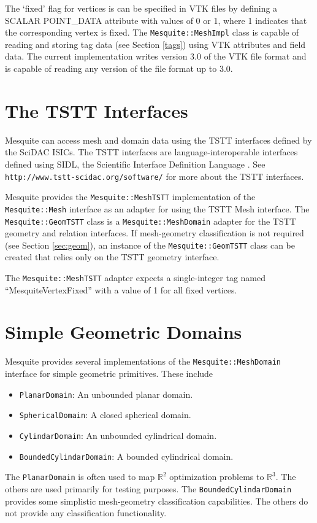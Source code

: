 The `fixed' flag for vertices is can be specified in VTK files by defining a
SCALAR POINT\_DATA attribute with values of 0 or 1, where 1 indicates that the
corresponding vertex is fixed.  The \texttt{Mesquite::MeshImpl} class is capable
of reading and storing tag data (see Section \ref{tags}) using VTK attributes and
field data.  The current implementation writes version 3.0 of the VTK file format
and is capable of reading any version of the file format up to 3.0.  

\section{The TSTT Interfaces} \label{sec:TSTT}

Mesquite can access mesh and domain data using the TSTT \cite{tstt} interfaces 
defined by the SciDAC ISICs.  The TSTT interfaces are language-interoperable 
interfaces defined using SIDL, the Scientific Interface Definition Language
\cite{babel}.  See \texttt{http://www.tstt-scidac.org/software/} for more
about the TSTT interfaces.

Mesquite provides the \texttt{Mesquite::MeshTSTT} implementation of the 
\texttt{Mesquite::Mesh} interface as an adapter for using the TSTT Mesh
interface.  The \texttt{Mesquite::GeomTSTT} class is a
\texttt{Mesquite::MeshDomain} adapter for the TSTT geometry and relation
interfaces.  If mesh-geometry classification is not required (see Section
\ref{sec:geom}), an instance of the \texttt{Mesquite::GeomTSTT} class can be
created that relies only on the TSTT geometry interface.  

The \texttt{Mesquite::MeshTSTT} adapter expects a single-integer tag named 
``MesquiteVertexFixed'' with a value of 1 for all fixed vertices.

\section{Simple Geometric Domains} \label{sec:MsqGeom}

Mesquite provides several implementations of the
\texttt{Mesquite::MeshDomain} interface for simple geometric primitives.  These
include
\begin{itemize}
\item \texttt{PlanarDomain}: An unbounded planar domain.
\item \texttt{SphericalDomain}: A closed spherical domain.
\item \texttt{CylindarDomain}: An unbounded cylindrical domain.
\item \texttt{BoundedCylindarDomain}: A bounded cylindrical domain.
\end{itemize}
The \texttt{PlanarDomain} is often used to map $\mathbb{R}^{2}$ optimization
problems to $\mathbb{R}^{3}$.  The others are used primarily for testing
purposes.  The \texttt{BoundedCylindarDomain} provides some simplistic
mesh-geometry classification capabilities.  The others do not provide any
classification functionality.  
